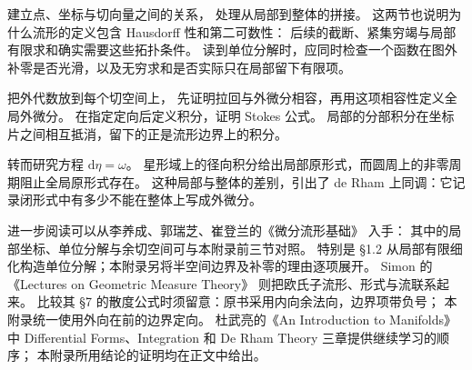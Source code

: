 \ProseParagraphBreak

建立点、坐标与切向量之间的关系，
处理从局部到整体的拼接。
这两节也说明为什么流形的定义包含 Hausdorff 性和第二可数性：
后续的截断、紧集穷竭与局部有限求和确实需要这些拓扑条件。
读到单位分解时，应同时检查一个函数在图外补零是否光滑，以及无穷求和是否实际只在局部留下有限项。

\ProseParagraphBreak

把外代数放到每个切空间上，
先证明拉回与外微分相容，再用这项相容性定义全局外微分。
在指定定向后定义积分，证明 Stokes 公式。
局部的分部积分在坐标片之间相互抵消，留下的正是流形边界上的积分。

\ProseParagraphBreak

转而研究方程 \(\mathrm d\eta=\omega\)。
星形域上的径向积分给出局部原形式，而圆周上的非零周期阻止全局原形式存在。
这种局部与整体的差别，引出了 de Rham 上同调：它记录闭形式中有多少不能在整体上写成外微分。

\ProseParagraphBreak

进一步阅读可以从李养成、郭瑞芝、崔登兰的《微分流形基础》
\cite[第1章，\S1.1--\S1.3]{LiGuoCui2011Manifolds}入手：
其中的局部坐标、单位分解与余切空间可与本附录前三节对照。
特别是 \S1.2 从局部有限细化构造单位分解；本附录另将半空间边界及补零的理由逐项展开。
Simon 的《Lectures on Geometric Measure Theory》
\cite[\S7, \S\S25--26]{Simon1983Lectures}则把欧氏子流形、形式与流联系起来。
比较其 \S7 的散度公式时须留意：原书采用内向余法向，边界项带负号；
本附录统一使用外向在前的边界定向。
杜武亮的《An Introduction to Manifolds》\cite{Tu2011Introduction}
中 Differential Forms、Integration 和 De Rham Theory 三章提供继续学习的顺序；
本附录所用结论的证明均在正文中给出。







